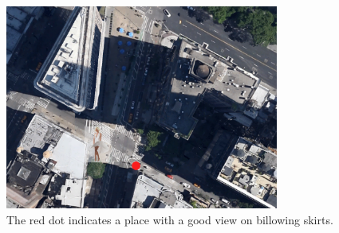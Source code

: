 \begin{figure}[htbp]
	\centering
		\includegraphics[width=0.80\textwidth]{recommendation.png}
	\caption{The red dot indicates a place with a good view on billowing skirts.}
	\label{fig:recommendation}
\end{figure}
